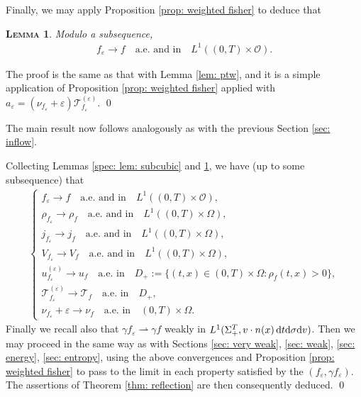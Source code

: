 \documentclass[10pt, reqno]{amsart}
\theoremstyle{plain}
\newtheorem{lemma}[theorem]{\normalfont \scshape Lemma}
\theoremstyle{definition}
\theoremstyle{remark}
\renewenvironment{proof}[1][\proofname]{\noindent{\scshape #1.\quad}}{\qed}
\numberwithin{equation}{section}
\newcommand{\calO}{\mathcal O}
\newcommand{\calT}{\mathcal T}
\newcommand{\ve}{\varepsilon}
\newcommand{\dv}{\textnormal{d}v}
\newcommand{\dt}{\textnormal{d}t}
\newcommand{\tnd}{\textnormal{d}}
\newcommand{\weakto}{\rightharpoonup}
\begin{document}
Finally, we may apply Proposition \ref{prop: weighted fisher} to deduce that
\begin{lemma}\label{spec: lem: ptw}
    Modulo a subsequence, 
    \begin{align*}
        f_\ve \to f \quad \text{a.e. and in} \quad L^1((0,T)\times\calO).
    \end{align*}
\end{lemma}
\begin{proof}
    The proof is the same as that with Lemma \ref{lem: ptw}, and it is a simple application of Proposition \ref{prop: weighted fisher} applied with $a_\ve = (\nu_{f_\ve} + \ve)\calT_{f_\ve}^{(\ve)}$.
\end{proof}

The main result now follows analogously as with the previous Section \ref{sec: inflow}.

\begin{proof}[Proof of Theorem \ref{thm: reflection}]
Collecting Lemmas \ref{spec: lem: subcubic} and \ref{spec: lem: ptw}, we have (up to some subsequence) that
\begin{align*}
    \begin{cases}
    f_\ve \to f \quad \text{a.e. and in}\quad L^1((0,T)\times \calO), \\
    \rho_{f_\ve} \to \rho_f \quad \text{a.e. and in}\quad L^1((0,T)\times \Omega),\\
    j_{f_\ve} \to j_f \quad \text{a.e. and in}\quad L^1((0,T)\times\Omega), \\
    V_{f_\ve} \to V_f \quad \text{a.e. and in}\quad L^1((0,T)\times \Omega), \\[4pt]
    u_{f_\ve}^{(\ve)}\to u_f \quad \text{a.e. in}\quad D_+ := \{(t,x)\in (0,T)\times\Omega: \rho_f(t,x) > 0 \}, \\[4pt]
    \calT_{f_\ve}^{(\ve)} \to \calT_f \quad \text{a.e. in} \quad D_+, \\
    \nu_{f_\ve} + \ve \to \nu_f \quad \text{a.e. in} \quad (0,T)\times\Omega.
    \end{cases}
\end{align*}
Finally we recall also that $\gamma f_\ve \weakto \gamma f$ weakly in $L^1(\Sigma_+^T,v\cdot n(x)\,\dt\tnd\sigma\dv)$. Then we may proceed in the same way as with Sections \ref{sec: very weak}, \ref{sec: weak}, \ref{sec: energy}, \ref{sec: entropy}, using the above convergences and Proposition \ref{prop: weighted fisher} to pass to the limit in each property satisfied by the $(f_\ve,\gamma f_\ve)$. The assertions of Theorem \ref{thm: reflection} are then consequently deduced.
\end{proof}
\end{document}
